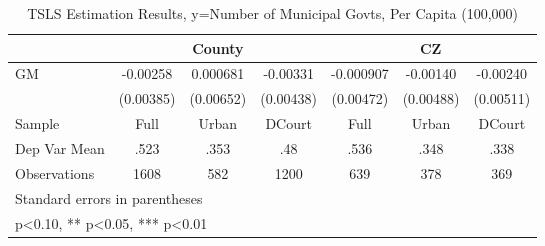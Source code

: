 \begin{table}[htbp]\centering
\def\sym#1{\ifmmode^{#1}\else\(^{#1}\)\fi}
\caption{TSLS Estimation Results, y=Number of Municipal Govts, Per Capita (100,000)}
\begin{tabular}{l*{6}{c}}
\toprule
                &\multicolumn{3}{c}{County}            &\multicolumn{3}{c}{CZ}                \\\cmidrule(lr){2-4}\cmidrule(lr){5-7}
\midrule
GM              & -0.00258   & 0.000681   & -0.00331   &-0.000907   & -0.00140   & -0.00240   \\
                &(0.00385)   &(0.00652)   &(0.00438)   &(0.00472)   &(0.00488)   &(0.00511)   \\
\midrule
Sample          &     Full   &    Urban   &   DCourt   &     Full   &    Urban   &   DCourt   \\
Dep Var Mean    &     .523   &     .353   &      .48   &     .536   &     .348   &     .338   \\
Observations    &     1608   &      582   &     1200   &      639   &      378   &      369   \\
\bottomrule
\multicolumn{7}{l}{\footnotesize Standard errors in parentheses}\\
\multicolumn{7}{l}{\footnotesize * p<0.10, ** p<0.05, *** p<0.01}\\
\end{tabular}
\end{table}

